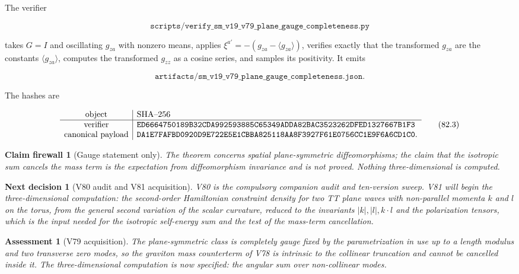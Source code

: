 \documentclass[11pt]{article}
\newtheorem{firewall}[theorem]{Claim firewall}
\newtheorem{decision}[theorem]{Next decision}
\newtheorem{assessment}[theorem]{Assessment}
\theoremstyle{remark}
\begin{document}
The verifier

\[
 \texttt{scripts/verify\_sm\_v19\_v79\_plane\_gauge\_completeness.py}
                                                                    \tag{82.1}
\]

takes \(G=I\) and oscillating \(g_{za}\) with nonzero means, applies
\(\xi^{a\prime}=-(g_{za}-\langle g_{za}\rangle)\), verifies exactly that
the transformed \(g_{za}\) are the constants \(\langle g_{za}\rangle\),
computes the transformed \(g_{zz}\) as a cosine series, and samples its
positivity.  It emits

\[
 \texttt{artifacts/sm\_v19\_v79\_plane\_gauge\_completeness.json}.   \tag{82.2}
\]

The hashes are

\[
\begin{array}{c|l}
\hbox{object}&\hbox{SHA--256}\\ \hline
\hbox{verifier}&
\texttt{ED6664750189B32CDA992593885C65349ADDA82BAC3523262DFED1327667B1F3}\\
\hbox{canonical payload}&
\texttt{DA1E7FAFBD0920D9E722E5E1CBBA825118AA8F3927F61E0756CC1E9F6A6CD1C0}.
\end{array}                                                     \tag{82.3}
\]

\begin{firewall}[Gauge statement only]
\label{fire:v19v79}
The theorem concerns spatial plane-symmetric diffeomorphisms; the
claim that the isotropic sum cancels the mass term is the expectation
from diffeomorphism invariance and is not proved.  Nothing
three-dimensional is computed.
\end{firewall}

\begin{decision}[V80 audit and V81 acquisition]
\label{dec:v19v79-next}
V80 is the compulsory companion audit and ten-version sweep.  V81 will
begin the three-dimensional computation: the second-order Hamiltonian
constraint density for two TT plane waves with non-parallel momenta
\(k\) and \(l\) on the torus, from the general second variation of the
scalar curvature, reduced to the invariants \(|k|,|l|,k\cdot l\) and the
polarization tensors, which is the input needed for the isotropic
self-energy sum and the test of the mass-term cancellation.
\end{decision}

\begin{assessment}[V79 acquisition]
\label{ass:v19v79}
The plane-symmetric class is completely gauge fixed by the
parametrization in use up to a length modulus and two transverse zero
modes, so the graviton mass counterterm of V78 is intrinsic to the
collinear truncation and cannot be cancelled inside it.  The
three-dimensional computation is now specified: the angular sum over
non-collinear modes.
\end{assessment}
\end{document}
